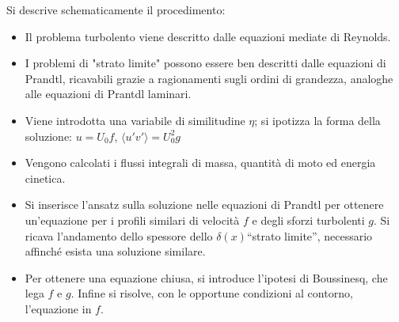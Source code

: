 \sol
Si descrive schematicamente il procedimento:
\begin{itemize}
\item Il problema turbolento viene descritto dalle equazioni mediate di Reynolds.
\item I problemi di "strato limite" possono essere ben descritti dalle equazioni
      di Prandtl, ricavabili grazie a ragionamenti sugli ordini di grandezza,
      analoghe alle equazioni di Prantdl laminari.
\item Viene introdotta una variabile di similitudine $\eta$; si ipotizza
      la forma della soluzione: $u = U_0 f$, $\langle u'v' \rangle = U_0^2 g$
\item Vengono calcolati i flussi integrali di massa, quantità di moto ed energia
      cinetica.
\item Si inserisce l'ansatz sulla soluzione nelle equazioni di Prandtl per
      ottenere un'equazione per i profili similari di velocità $f$ e degli 
      sforzi turbolenti $g$.
      Si ricava l'andamento dello spessore dello $\delta(x)$``strato limite'',
      necessario affinché esista una soluzione similare.
\item Per ottenere una equazione chiusa, si introduce l'ipotesi di Boussinesq, che
      lega $f$ e $g$. Infine si risolve, con le opportune condizioni al contorno,
      l'equazione in $f$.

\end{itemize}


